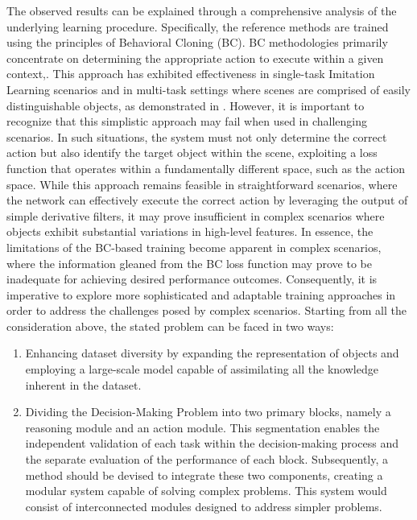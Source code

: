 \newline The observed results can be explained through a comprehensive analysis of the underlying learning procedure. Specifically, the reference methods \cite{dasari2021transformers_one_shot,mandi2022towards_more_generalizable_one_shot,brohan2022rt} are trained using the principles of Behavioral Cloning (BC). BC methodologies primarily concentrate on determining the appropriate action to execute within a given context,. This approach has exhibited effectiveness in single-task Imitation Learning scenarios \cite{zhang2018deep_vr_teleoperation,duan2017one_shot_il} and in multi-task settings where scenes are comprised of easily distinguishable objects, as demonstrated in \cite{dasari2021transformers_one_shot,mandi2022towards_more_generalizable_one_shot,brohan2022rt}. However, it is important to recognize that this simplistic approach may fail when used in challenging scenarios. In such situations, the system must not only determine the correct action but also identify the target object within the scene, exploiting a loss function that operates within a fundamentally different space, such as the action space. While this approach remains feasible in straightforward scenarios, where the network can effectively execute the correct action by leveraging the output of simple derivative filters, it may prove insufficient in complex scenarios where objects exhibit substantial variations in high-level features.
\newline In essence, the limitations of the BC-based training become apparent in complex scenarios, where the information gleaned from the BC loss function may prove to be inadequate for achieving desired performance outcomes. Consequently, it is imperative to explore more sophisticated and adaptable training approaches in order to address the challenges posed by complex scenarios.
Starting from all the consideration above, the stated problem can be faced in two ways:
\begin{enumerate}
    \item Enhancing dataset diversity by expanding the representation of objects and employing a large-scale model capable of assimilating all the knowledge inherent in the dataset.
    \item Dividing the Decision-Making Problem into two primary blocks, namely a reasoning module and an action module. This segmentation enables the independent validation of each task within the decision-making process and the separate evaluation of the performance of each block. Subsequently, a method should be devised to integrate these two components, creating a modular system capable of solving complex problems. This system would consist of interconnected modules designed to address simpler problems.
\end{enumerate}
